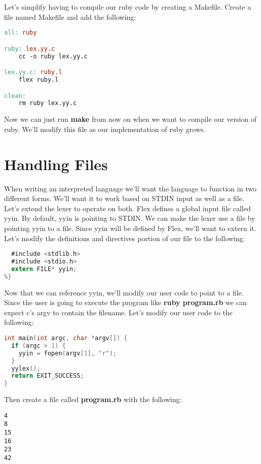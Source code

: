 {Let's simplify having to compile our ruby code by creating a Makefile. Create a file named Makefile and add the following:

\begin{lstlisting}[language=make]
all: ruby

ruby: lex.yy.c
	cc -o ruby lex.yy.c

lex.yy.c: ruby.l
	flex ruby.l

clean:
	rm ruby lex.yy.c
\end{lstlisting}

Now we can just run {\bf make} from now on when we want to compile our version of ruby. We'll modify this file as our implementation of ruby grows.

\section{Handling Files}

When writing an interpreted language we'll want the language to function in two different forms. We'll want it to work based on STDIN input as well as a file. Let's extend the lexer to operate on both. Flex defines a global input file called yyin. By default, yyin is pointing to STDIN. We can make the lexer use a file by pointing yyin to a file. Since yyin will be defined by Flex, we'll want to extern it. Let's modify the definitions and directives portion of our file to the following:

\begin{lstlisting}[language=C]
%{
  #include <stdlib.h>
  #include <stdio.h>
  extern FILE* yyin;
%}
\end{lstlisting}

Now that we can reference yyin, we'll modify our user code to point to a file. Since the user is going to execute the program like {\bf ruby program.rb} we can expect c's argv to contain the filename. Let's modify our user code to the following:

\begin{lstlisting}[language=C]
int main(int argc, char *argv[]) {
  if (argc > 1) {
    yyin = fopen(argv[1], "r");
  }
  yylex();
  return EXIT_SUCCESS;
}
\end{lstlisting}

Then create a file called {\bf program.rb} with the following:

\begin{lstlisting}
4
8
15
16
23
42
\end{lstlisting}

}
